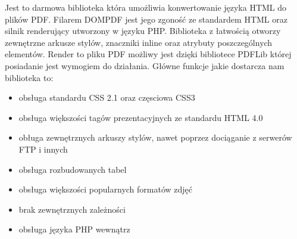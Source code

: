 Jest to darmowa biblioteka która umożliwia konwertowanie języka HTML do plików PDF. Filarem DOMPDF jest jego zgoność ze standardem HTML oraz silnik renderujący utworzony w języku PHP. 
Biblioteka z łatwością otworzy zewnętrzne arkusze stylów, znaczniki inline oraz atrybuty poszczególnych elementów.
Render to pliku PDF możliwy jest dzięki bibliotece PDFLib której posiadanie jest wymogiem do działania.
Główne funkcje jakie dostarcza nam biblioteka to:

\begin{itemize}
    \item obsługa standardu CSS 2.1 oraz częsciowa CSS3
    \item obsługa większości tagów prezentacyjnych ze standardu HTML 4.0
    \item obługa zewnętrznych arkuszy stylów, nawet poprzez dociąganie z serwerów FTP i innych
    \item obsługa rozbudowanych tabel
    \item obsługa większości popularnych formatów zdjęć
    \item brak zewnętrznych zależności
    \item obsługa języka PHP wewnątrz
\end{itemize}
